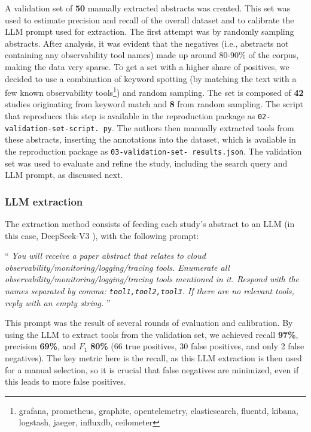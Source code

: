 \documentclass[sigconf]{acmart}
\begin{document}
A validation set of \textbf{50} manually extracted abstracts was created. This
set was used to estimate precision and recall of the overall dataset and to
calibrate the LLM prompt used for extraction. The first attempt was by randomly
sampling abstracts. After analysis, it was evident that the negatives (i.e.,
abstracts not containing any observability tool names) made up around 80-90\%
of the corpus, making the data very sparse. To get a set with a higher share
of positives, we decided to use a combination of keyword spotting (by matching
the text with a few known observability tools\footnote{grafana, prometheus,
graphite, opentelemetry, elasticsearch, fluentd, kibana, logstash,   jaeger,
influxdb, ceilometer}) and random sampling. The set is composed of \textbf{42}
studies originating from keyword match and \textbf{8} from random sampling. The
script that reproduces this step is available in the reproduction package as
\texttt{02-\allowbreak validation-\allowbreak set-\allowbreak script.\allowbreak
py}. The authors then manually extracted tools from these abstracts, inserting
the annotations into the dataset, which is available in the reproduction
package as \texttt{03-\allowbreak validation-\allowbreak set-\allowbreak
results.\allowbreak json}. The validation set was used to evaluate and refine
the study, including the search query and LLM prompt, as discussed next.

\subsubsection{LLM extraction}\label{llm-extraction}

The extraction method consists of feeding each study's abstract to an
LLM (in this case, DeepSeek-V3 \cite{deepseekv3}), with the
following prompt:

`` \emph{You will receive a paper abstract that relates to cloud
observability/monitoring/logging/tracing tools. Enumerate all
observability/monitoring/logging/tracing tools mentioned in it. Respond
with the names separated by comma: \texttt{tool1,tool2,tool3}. If there
are no relevant tools, reply with an empty string.} ''

This prompt was the result of several rounds of evaluation and calibration.
By using the LLM to extract tools from the validation set, we achieved recall
\textbf{97\%}, precision \textbf{69\%}, and $F_1$ \textbf{80\%} (66 true
positives, 30 false positives, and only 2 false negatives). The key metric here
is the recall, as this LLM extraction is then used for a manual selection, so
it is crucial that false negatives are minimized, even if this leads to more
false positives.
\end{document}
